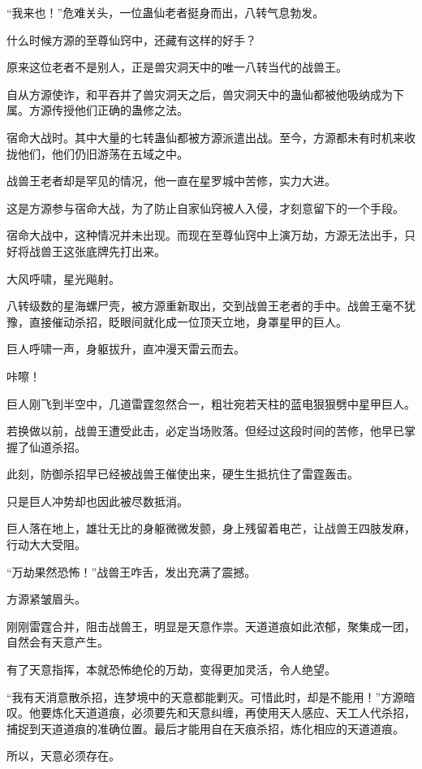 \begin{this_body}
“我来也！”危难关头，一位蛊仙老者挺身而出，八转气息勃发。

什么时候方源的至尊仙窍中，还藏有这样的好手？

原来这位老者不是别人，正是兽灾洞天中的唯一八转当代的战兽王。

自从方源使诈，和平吞并了兽灾洞天之后，兽灾洞天中的蛊仙都被他吸纳成为下属。方源传授他们正确的蛊修之法。

宿命大战时。其中大量的七转蛊仙都被方源派遣出战。至今，方源都未有时机来收拢他们，他们仍旧游荡在五域之中。

战兽王老者却是罕见的情况，他一直在星罗城中苦修，实力大进。

这是方源参与宿命大战，为了防止自家仙窍被人入侵，才刻意留下的一个手段。

宿命大战中，这种情况并未出现。而现在至尊仙窍中上演万劫，方源无法出手，只好将战兽王这张底牌先打出来。

大风呼啸，星光飚射。

八转级数的星海螺尸壳，被方源重新取出，交到战兽王老者的手中。战兽王毫不犹豫，直接催动杀招，眨眼间就化成一位顶天立地，身罩星甲的巨人。

巨人呼啸一声，身躯拔升，直冲漫天雷云而去。

咔嚓！

巨人刚飞到半空中，几道雷霆忽然合一，粗壮宛若天柱的蓝电狠狠劈中星甲巨人。

若换做以前，战兽王遭受此击，必定当场败落。但经过这段时间的苦修，他早已掌握了仙道杀招。

此刻，防御杀招早已经被战兽王催使出来，硬生生抵抗住了雷霆轰击。

只是巨人冲势却也因此被尽数抵消。

巨人落在地上，雄壮无比的身躯微微发颤，身上残留着电芒，让战兽王四肢发麻，行动大大受阻。

“万劫果然恐怖！”战兽王咋舌，发出充满了震撼。

方源紧皱眉头。

刚刚雷霆合并，阻击战兽王，明显是天意作祟。天道道痕如此浓郁，聚集成一团，自然会有天意产生。

有了天意指挥，本就恐怖绝伦的万劫，变得更加灵活，令人绝望。

“我有天消意散杀招，连梦境中的天意都能剿灭。可惜此时，却是不能用！”方源暗叹。他要炼化天道道痕，必须要先和天意纠缠，再使用天人感应、天工人代杀招，捕捉到天道道痕的准确位置。最后才能用自在天痕杀招，炼化相应的天道道痕。

所以，天意必须存在。


\end{this_body}
